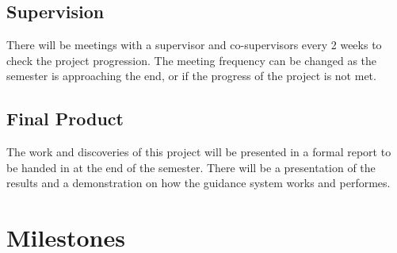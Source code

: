 \documentclass[a4paper,10pt]{article}
\begin{document}
	
	\subsection{Supervision}
	There will be meetings with a supervisor and co-supervisors every 2 weeks to check the project progression. The meeting frequency can be changed as the semester is approaching the end, or if the progress of the project is not met.
	
	\subsection{Final Product}
	The work and discoveries of this project will be presented in a formal report to be handed in at the end of the semester. There will be a presentation of the results and a demonstration on how the guidance system works and performes.

\section{Milestones}
\end{document}
